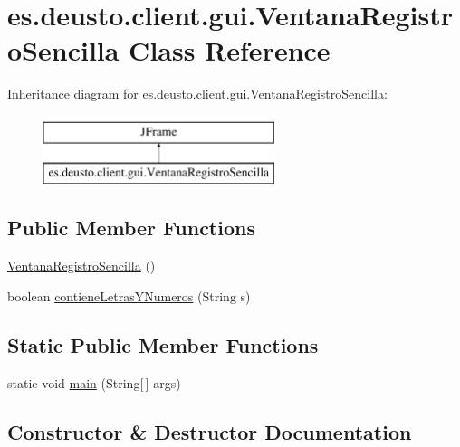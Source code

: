 \hypertarget{classes_1_1deusto_1_1client_1_1gui_1_1_ventana_registro_sencilla}{}\section{es.\+deusto.\+client.\+gui.\+Ventana\+Registro\+Sencilla Class Reference}
\label{classes_1_1deusto_1_1client_1_1gui_1_1_ventana_registro_sencilla}
Inheritance diagram for es.\+deusto.\+client.\+gui.\+Ventana\+Registro\+Sencilla\+:\begin{figure}[H]
\begin{center}
\leavevmode
\includegraphics[height=2.000000cm]{classes_1_1deusto_1_1client_1_1gui_1_1_ventana_registro_sencilla}
\end{center}
\end{figure}
\subsection*{Public Member Functions}
\begin{DoxyCompactItemize}
\item 
\mbox{\hyperlink{classes_1_1deusto_1_1client_1_1gui_1_1_ventana_registro_sencilla_a0e703bb8ee2ccbe906ae918ff5acc4a8}{Ventana\+Registro\+Sencilla}} ()
\item 
boolean \mbox{\hyperlink{classes_1_1deusto_1_1client_1_1gui_1_1_ventana_registro_sencilla_ade8fc5021e7ef78b34131550b483b095}{contiene\+Letras\+Y\+Numeros}} (String s)
\end{DoxyCompactItemize}
\subsection*{Static Public Member Functions}
\begin{DoxyCompactItemize}
\item 
static void \mbox{\hyperlink{classes_1_1deusto_1_1client_1_1gui_1_1_ventana_registro_sencilla_afbed3926824c094b8d30800f8708782b}{main}} (String\mbox{[}$\,$\mbox{]} args)
\end{DoxyCompactItemize}


\subsection{Constructor \& Destructor Documentation}
\mbox{\label{classes_1_1deusto_1_1client_1_1gui_1_1_ventana_registro_sencilla_a0e703bb8ee2ccbe906ae918ff5acc4a8}} 

